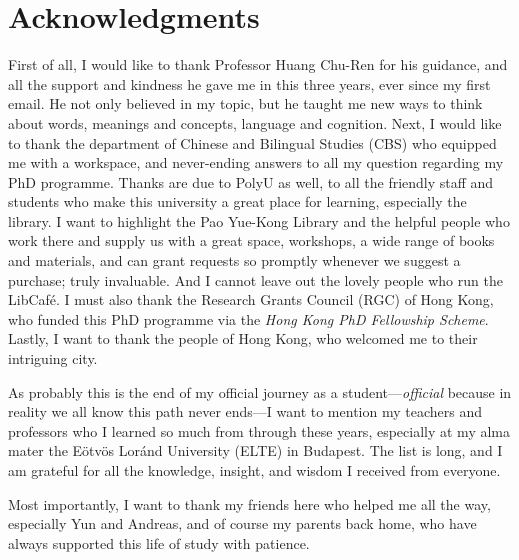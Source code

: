 \chapter*{Acknowledgments}
\label{ch:acknowledgments}


First of all, I would like to thank Professor Huang Chu-Ren for his guidance, and all the support and kindness he gave me in this three years, ever since my first email. He not only believed in my topic, but he taught me new ways to think about words, meanings and concepts, language and cognition. Next, I would like to thank the department of Chinese and Bilingual Studies (CBS) who equipped me with a workspace, and never-ending answers to all my question regarding my PhD programme. Thanks are due to PolyU as well, to all the friendly staff and students who make this university a great place for learning, especially the library. I want to highlight the Pao Yue-Kong Library and the helpful people who work there and supply us with a great space, workshops, a wide range of books and materials, and can grant requests so promptly whenever we suggest a purchase; truly invaluable. And I cannot leave out the lovely people who run the LibCafé. I must also thank the Research Grants Council (RGC) of Hong Kong, who funded this PhD programme via the \textit{Hong Kong PhD Fellowship Scheme}. Lastly, I want to thank the people of Hong Kong, who welcomed me to their intriguing city.


As probably this is the end of my official journey as a student---\textit{official} because in reality we all know this path never ends---I want to mention my teachers and professors who I learned so much from through these years, especially at my alma mater the Eötvös Loránd University (ELTE) in Budapest. The list is long, and I am grateful for all the knowledge, insight, and wisdom I received from everyone.


Most importantly, I want to thank my friends here who helped me all the way, especially Yun and Andreas, and of course my parents back home, who have always supported this life of study with patience.
